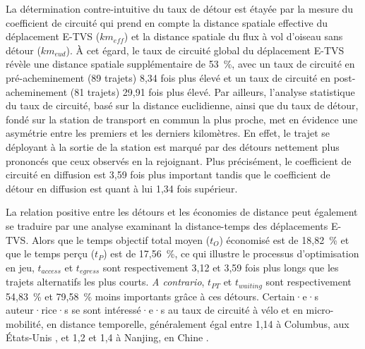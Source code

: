 \begin{refsegment}

La détermination contre-intuitive du taux de détour est étayée par la mesure du coefficient de circuité qui prend en compte la distance spatiale effective du déplacement \acrshort{E-TVS} (\(km_{eff}\)) et la distance spatiale du flux à vol d'oiseau sans détour (\(km_{eud}\)). À cet égard, le taux de circuité global du déplacement \acrshort{E-TVS} révèle une distance spatiale supplémentaire de 53~\%, avec un taux de circuité en pré-acheminement (89 trajets) 8,34 fois plus élevé et un taux de circuité en post-acheminement (81 trajets) 29,91 fois plus élevé. Par ailleurs, l'analyse statistique du taux de circuité, basé sur la distance euclidienne, ainsi que du taux de détour, fondé sur la station de transport en commun la plus proche, met en évidence une asymétrie entre les premiers et les derniers kilomètres. En effet, le trajet se déployant à la sortie de la station est marqué par des détours nettement plus prononcés que ceux observés en la rejoignant. Plus précisément, le coefficient de circuité en diffusion est 3,59 fois plus important tandis que le coefficient de détour en diffusion est quant à lui 1,34 fois supérieur.%

La relation positive entre les détours et les économies de distance peut également se traduire par une analyse examinant la distance-temps des déplacements \acrshort{E-TVS}. Alors que le temps objectif total moyen (\(t_{O}\)) économisé est de 18,82~\% et que le temps perçu (\(t_{P}\)) est de 17,56~\%, ce qui illustre le processus d'optimisation en jeu, \(t_{access}\) et \(t_{egress}\) sont respectivement 3,12 et 3,59 fois plus longs que les trajets alternatifs les plus courts. \textsl{A contrario}, \(t_{PT}\) et \(t_{waiting}\) sont respectivement 54,83~\% et 79,58~\% moins importants grâce à ces détours. Certain·e·s auteur·rice·s se sont intéressé·e·s au taux de circuité à vélo et en micro-mobilité, en distance temporelle, généralement égal entre 1,14 à Columbus, aux États-Unis \textcolor{blue}{\autocite[195]{park_why_2019}}, et 1,2 et 1,4 à Nanjing, en Chine \textcolor{blue}{\autocite[10]{li_measuring_2022}}.%


\end{refsegment}
